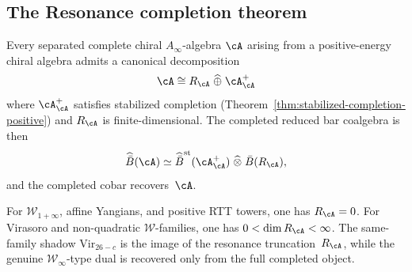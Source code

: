 \subsection{The Resonance completion theorem}

\begin{theorem}
\label{conj:platonic-completion}%
\label{thm:platonic-completion}%
%
%
Every separated complete chiral $A_\infty$-algebra $\cA$
arising from a positive-energy chiral algebra admits a canonical
decomposition
\[
\cA \cong R_\cA \;\widehat{\oplus}\; \cA^+_\cA
\]
where $\cA^+_\cA$ satisfies stabilized completion
\textup{(}Theorem~\textup{\ref{thm:stabilized-completion-positive})}
and $R_\cA$ is finite-dimensional.  The completed reduced bar
coalgebra is then
\[
\widehat{\bar B}(\cA)
\simeq
\widehat{\bar B}^{\mathrm{st}}(\cA^+_\cA)
\;\widehat{\otimes}\;
\bar B(R_\cA),
\]
and the completed cobar recovers~$\cA$.

For $\mathcal{W}_{1+\infty}$, affine Yangians, and positive
RTT towers, one has $R_\cA = 0$.
For Virasoro and non-quadratic $\mathcal{W}$-families, one has
$0 < \dim R_\cA < \infty$.
The same-family shadow $\mathrm{Vir}_{26-c}$ is the image of the
resonance truncation~$R_\cA$, while the genuine
$\mathcal{W}_\infty$-type dual is recovered only from the full
completed object.
\end{theorem}

